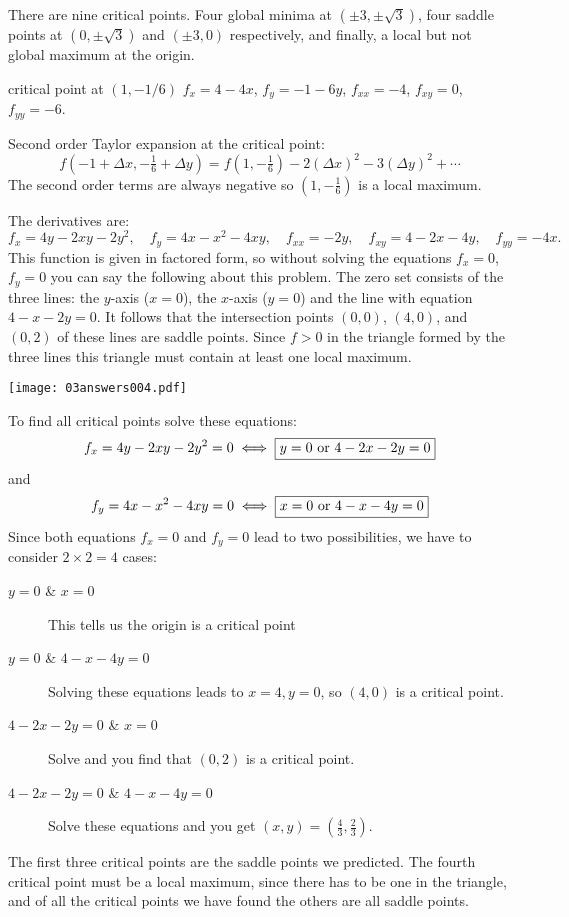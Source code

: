 \item[{\bfseries(V6.1f)}]

There are nine critical points. Four global minima at $(\pm 3,
\pm\sqrt{3})$, four saddle points at $(0,\pm\sqrt{3})$ and $(\pm3,0)$
respectively, and finally, a local but not global maximum at the
origin.
\bigskip

\item[{\bfseries(V6.1g)}]
 critical point at $(1,-1/6)$
$f_x = 4-4x$, $f_y = -1-6y$, $f_{xx} = -4$, $f_{xy}=0$, $f_{yy}=-6$.

Second order Taylor expansion at the critical point:
\[
f(-1+\Delta x, -\tfrac16+\Delta y) = f(1, -\tfrac16)
-2(\Delta x)^2-3(\Delta y)^2 + \cdots
\]
The second order terms are always negative so $(1, -\tfrac16)$ is a
local maximum.
\bigskip

\item[{\bfseries(V6.1h)}]
 The derivatives are:
\[
f_x = 4y-2xy-2y^2,\quad f_y = 4x-x^2-4xy,\quad f_{xx} = -2y,\quad
f_{xy}=4-2x-4y,\quad f_{yy}=-4x.
\]
This function is given in factored form, so without solving the
equations $f_x=0$, $f_y=0$ you can say the following about this
problem.  The zero set consists of the three lines: the $y$-axis
($x=0$), the $x$-axis ($y=0$) and the line with equation $4-x-2y=0$.
It follows that the intersection points $(0,0)$, $(4,0)$, and $(0,2)$
of these lines are saddle points.  Since $f>0$ in the triangle formed
by the three lines this triangle must contain at least one local
maximum.

\begin{center}
  \texttt{[image: 03answers004.pdf]}
\end{center}
To find all critical points solve these equations:
\[
f_x = 4y-2xy-2y^2 = 0 \iff \text{\framebox{$y=0$ or $4-2x-2y=0$}}
\]
and
\[
f_y = 4x-x^2-4xy=0  \iff \text{\framebox{$x=0$ or $4-x-4y=0$}}
\]
Since both equations $f_x=0$ and $f_y=0$ lead to two possibilities, we
have to consider $2\times 2=4$ cases:
\begin{description}
  \item[$y=0$ \& $x=0$] This tells us the origin is a critical point
  \item[$y=0$ \& $4-x-4y=0$] Solving these equations leads to
    $x=4, y=0$, so $(4,0)$ is a critical point.
  \item[$4-2x-2y=0$ \& $x=0$] Solve and you find that $(0,2)$ is a
    critical point.
  \item[$4-2x-2y=0$ \& $4-x-4y=0$] Solve these equations and you get
    $(x,y) = (\tfrac43, \tfrac23)$.
\end{description}
The first three critical points are the saddle points we predicted.
The fourth critical point must be a local maximum, since there has to
be one in the triangle, and of all the critical points we have found
the others are all saddle points.
\bigskip

